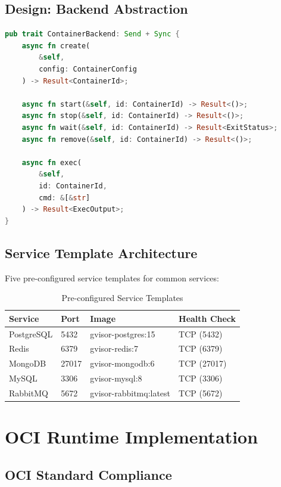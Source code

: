 \documentclass[12pt,twoside,openright]{book}
\theoremstyle{plain}
\theoremstyle{definition}
\theoremstyle{remark}
\begin{document}
\section{Design: Backend Abstraction}

\begin{lstlisting}[language=Rust, caption=Backend Trait Definition]
pub trait ContainerBackend: Send + Sync {
    async fn create(
        &self,
        config: ContainerConfig
    ) -> Result<ContainerId>;

    async fn start(&self, id: ContainerId) -> Result<()>;
    async fn stop(&self, id: ContainerId) -> Result<()>;
    async fn wait(&self, id: ContainerId) -> Result<ExitStatus>;
    async fn remove(&self, id: ContainerId) -> Result<()>;

    async fn exec(
        &self,
        id: ContainerId,
        cmd: &[&str]
    ) -> Result<ExecOutput>;
}
\end{lstlisting}

\section{Service Template Architecture}

Five pre-configured service templates for common services:

\begin{table}[H]
\centering
\begin{tabular}{|l|l|l|l|}
\hline
\textbf{Service} & \textbf{Port} & \textbf{Image} & \textbf{Health Check} \\
\hline
PostgreSQL & 5432 & gvisor-postgres:15 & TCP (5432) \\
\hline
Redis & 6379 & gvisor-redis:7 & TCP (6379) \\
\hline
MongoDB & 27017 & gvisor-mongodb:6 & TCP (27017) \\
\hline
MySQL & 3306 & gvisor-mysql:8 & TCP (3306) \\
\hline
RabbitMQ & 5672 & gvisor-rabbitmq:latest & TCP (5672) \\
\hline
\end{tabular}
\caption{Pre-configured Service Templates}
\label{tab:service_templates}
\end{table}

\chapter{OCI Runtime Implementation}

\section{OCI Standard Compliance}
\end{document}
